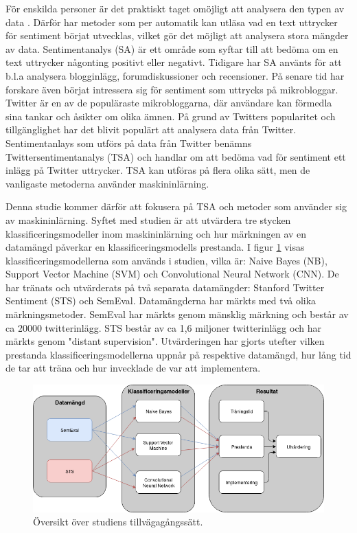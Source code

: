 \documentclass{kaumasters} %
\begin{document}
För enskilda personer är det praktiskt taget omöjligt att analysera den typen av data \cite{TSAsurvey}. Därför har metoder som per automatik kan utläsa vad en text uttrycker för sentiment börjat utvecklas, vilket gör det möjligt att analysera stora mängder av data. Sentimentanalys (SA) är ett område som syftar till att bedöma om en text uttrycker någonting positivt eller negativt. Tidigare har SA använts för att b.l.a analysera blogginlägg, forumdiskussioner och recensioner. På senare tid har forskare även börjat intressera sig för sentiment som uttrycks på mikrobloggar. Twitter är en av de populäraste mikrobloggarna, där användare kan förmedla sina tankar och åsikter om olika ämnen. På grund av Twitters popularitet och tillgänglighet har det blivit populärt att analysera data från Twitter. Sentimentanlays som utförs på data från Twitter benämns Twittersentimentanalys (TSA) och handlar om att bedöma vad för sentiment ett inlägg på Twitter uttrycker.  TSA kan utföras på flera olika sätt, men de vanligaste metoderna använder maskininlärning.


Denna studie kommer därför att fokusera på TSA och metoder som använder sig av maskininlärning. Syftet med studien är att utvärdera tre stycken klassificeringsmodeller inom maskininlärning och hur märkningen av en datamängd påverkar en klassificeringsmodells prestanda. I figur \ref{fig:helhet} visas klassificeringsmodellerna som används i studien, vilka är: Naive Bayes (NB), Support Vector Machine (SVM) och Convolutional Neural Network (CNN). De har tränats och utvärderats på två separata datamängder: Stanford Twitter Sentiment (STS) och SemEval. Datamängderna har märkts med två olika märkningsmetoder. SemEval har märkts genom mänsklig märkning och består av ca 20000 twitterinlägg. STS består av ca 1,6 miljoner twitterinlägg och har märkts genom "distant supervision". Utvärderingen har gjorts utefter vilken prestanda klassificeringsmodellerna uppnår på respektive datamängd, hur lång tid de tar att träna och hur invecklade de var att implementera. 

\begin{figure}[h]
\includegraphics[width=14cm]{helthetsbild}
\centering
\caption{Översikt över studiens tillvägagångssätt.}
\label{fig:helhet}
\end{figure}
\end{document}
